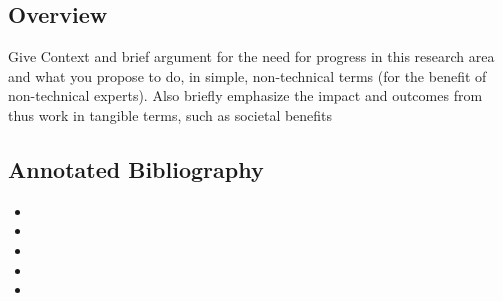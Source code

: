 \documentclass{article}
\begin{document}
\subsection{Overview}

Give Context and brief argument for the need for progress in this research area and what you propose to do, in simple, non-technical terms (for the benefit of non-technical experts). Also briefly emphasize the impact and outcomes from thus work in tangible terms, such as societal benefits
\subsection{Annotated Bibliography}

\begin{itemize}
    \item {}
    \item {}
    \item {}
    \item {}
    \item {}
\end{itemize}

\printbibliography
\end{document}
